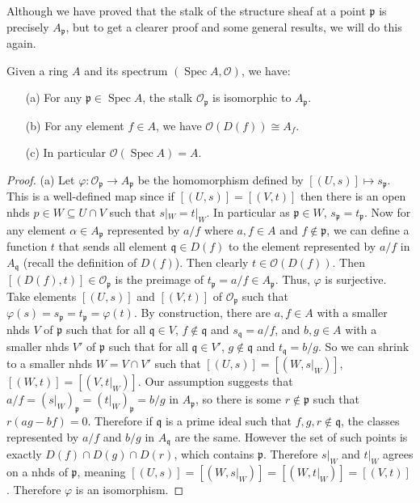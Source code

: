 \documentclass[12pt,letter]{article}
\newcommand{\Spec}[0]{\operatorname{Spec}}
\begin{document}
	Although we have proved that the stalk of the structure sheaf at a point $\mathfrak p$ is precisely $A_{\mathfrak p}$, but to get a clearer proof and some general results, we will do this again.
	\begin{lemma}\label{l213}
	Given a ring $A$ and its spectrum $(\Spec A, \mathscr O)$, we have:
	\begin{enumerate}
\item[(a)] For any $\mathfrak p\in\Spec A$, the stalk $\mathscr O_{\mathfrak p}$ is isomorphic to $A_{\mathfrak p}$.
\item[(b)] For any element $f\in A$, we have $\mathscr O(D(f))\cong A_f$.
\item[(c)] In particular $\mathscr O(\Spec A)=A$.
\end{enumerate}
	\end{lemma}
	\begin{proof}
	(a) Let $\varphi:\mathscr O_{\mathfrak p}\to A_{\mathfrak p}$ be the homomorphism defined by $[(U, s)]\mapsto s_{\mathfrak p}$. This is a well-defined map since if $[(U, s)]=[(V, t)]$ then there is an open nhds $p\in W\subseteq U\cap V$ such that $s|_W=t|_W$. In particular as $\mathfrak p \in W$, $s_{\mathfrak p}=t_{\mathfrak p}$. Now for any element $\alpha\in A_{\mathfrak p}$ represented by $a/f$ where $a, f\in A$ and $f\notin \mathfrak p$, we can define a function $t$ that sends all element $\mathfrak q\in D(f)$ to the element represented by $a/f$ in $A_{\mathfrak q}$ (recall the definition of $D(f)$). Then clearly $t\in\mathscr O(D(f))$. Then $[(D(f), t)]\in \mathscr O_{\mathfrak p}$ is the preimage of $t_{\mathfrak p}=a/f\in A_{\mathfrak p}$. Thus, $\varphi$ is surjective. Take elements $[(U, s)]$ and $[(V, t)]$ of $\mathscr O_{\mathfrak p}$ such that $\varphi(s)=s_{\mathfrak p}=t_{\mathfrak p}=\varphi(t)$. By construction, there are $a, f\in A$ with a smaller nhds $V$ of $\mathfrak p$ such that for all $\mathfrak q\in V$, $f\notin \mathfrak q$ and $s_{\mathfrak q}=a/f$, and $b, g\in A$ with a smaller nhds $V'$ of $\mathfrak p$ such that for all $\mathfrak q\in V'$, $g\notin \mathfrak q$ and $t_{\mathfrak q}=b/g$. So we can shrink to a smaller nhds $W=V\cap V'$ such that $[(U, s)]=[(W, s|_W)]$, $[(W, t)]=[(V, t|_W)]$. Our assumption suggests that $a/f=(s|_W)_{\mathfrak p}=(t|_{W})_{\mathfrak p}=b/g$ in $A_{\mathfrak p}$, so there is some $r\notin \mathfrak p$ such that $r(ag-bf)=0$. Therefore if $\mathfrak q$ is a prime ideal such that $f, g, r\notin \mathfrak q$, the classes represented by $a/f$ and $b/g$ in $A_{\mathfrak q}$ are the same. However the set of such points is exactly $D(f)\cap D(g)\cap D(r)$, which contains $\mathfrak p$. Therefore $s|_W$ and $t|_W$ agrees on a nhds of $\mathfrak p$, meaning $[(U, s)]=[(W, s|_W)]=[(W, t|_W)]=[(V, t)]$. Therefore $\varphi$ is an isomorphism.
	

\end{proof}
\end{document}
